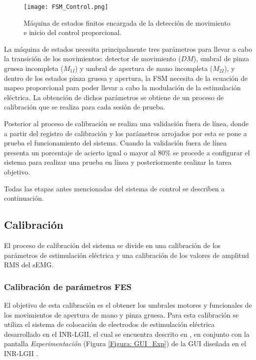 
\begin{figure}[htbp]
	\centering
	\texttt{[image: FSM\_Control.png]}
	\caption[FSM para control]{Máquina de estados finitos encargada de la detección de movimiento e inicio del control proporcional.}
	\label{Figura: FSM_Control}
\end{figure}

La máquina de estados necesita principalmente tres parámetros para llevar a cabo la transición de los movimientos: detector de movimiento ($DM$), umbral de pinza gruesa incompleta ($M_{1I}$) y umbral de apertura de mano incompleta ($M_{2I}$), y dentro de los estados pinza gruesa y apertura, la FSM necesita de la ecuación de mapeo proporcional para poder llevar a cabo la modulación de la estimulación eléctrica. La obtención de dichos parámetros se obtiene de un proceso de calibración que se realiza para cada sesión de prueba.

Posterior al proceso de calibración se realiza una validación fuera de línea, donde a partir del registro de calibración y los parámetros arrojados por esta se pone a prueba el funcionamiento del sistema. Cuando la validación fuera de línea presenta un porcentaje de acierto igual o mayor al 80$\%$ se procede a configurar el sistema para realizar una prueba en línea y posteriormente realizar la tarea objetivo.

Todas las etapas antes mencionadas del sistema de control se describen a continuación.

\subsection{Calibración}
El proceso de calibración del sistema se divide en una calibración de los parámetros de estimulación eléctrica y una calibración de los valores de amplitud RMS del sEMG.

\subsubsection{Calibración de parámetros FES}
El objetivo de esta calibración es el obtener los umbrales motores y funcionales de los movimientos de apertura de mano y pinza gruesa. Para esta calibración se utiliza el sistema de colocación de electrodos de estimulación eléctrica desarrollado en el INR-LGII, el cual se encuentra descrito en \cite{AnaMartin2019}, en conjunto con la pantalla \emph{Experimentación} (Figura \ref{Figura: GUI_Exp}) de la GUI diseñada en el INR-LGII \cite{JanethFuentes2018}.

